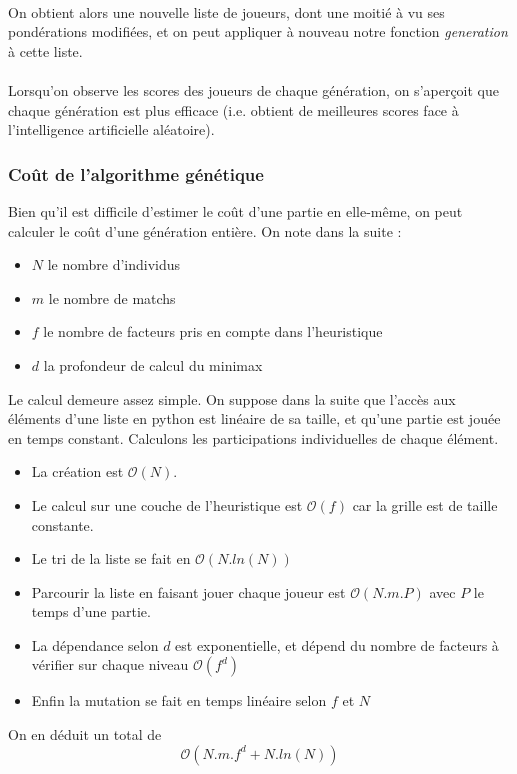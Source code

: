 \documentclass[10pt, french]{article}
\begin{document}
\begin{itemize}
\begin{itemize}
\paragraph{}
On obtient alors une nouvelle liste de joueurs, dont une moitié à vu ses pondérations modifiées, et on peut appliquer à nouveau notre fonction \textit{generation} à cette liste. 
\end{itemize}

\paragraph{}
Lorsqu'on observe les scores des joueurs de chaque génération, on s'aperçoit que chaque génération est plus efficace (i.e. obtient de meilleures scores face à l'intelligence artificielle aléatoire).
\end{itemize}
\paragraph{}
\subsubsection*{Coût de l'algorithme génétique}
\par Bien qu'il est difficile d'estimer le coût d'une partie en elle-même, on peut calculer le coût d'une génération entière.
On note dans la suite : 
\begin{itemize}
\item $N$ le nombre d'individus
\item $m$ le nombre de matchs
\item $f$ le nombre de facteurs pris en compte dans l'heuristique
\item $d$ la profondeur de calcul du minimax
\end{itemize}
Le calcul demeure assez simple. On suppose dans la suite que l'accès aux éléments d'une liste en python est linéaire de sa taille, et qu'une partie est jouée en temps constant. Calculons les participations individuelles de chaque élément.
\begin{itemize}
\item La création est $\mathcal{O}(N)$.
\item Le calcul sur une couche de l'heuristique est $\mathcal{O}(f)$ car la grille est de taille constante.
\item Le tri de la liste se fait en $\mathcal{O}(N.ln(N))$
\item Parcourir la liste en faisant jouer chaque joueur est $\mathcal{O}(N.m.P)$ avec $P$ le temps d'une partie.
\item La dépendance selon $d$ est exponentielle, et dépend du nombre de facteurs à vérifier sur chaque niveau $\mathcal{O}(f^d)$
\item Enfin la mutation se fait en temps linéaire selon $f$ et $N$
\end{itemize}
\par On en déduit un total de $$\boxed{\mathcal{O}(N.m.f^d+N.ln(N))}$$ 
\end{document}
